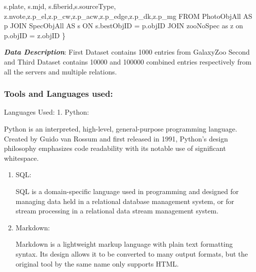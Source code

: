 \documentclass[11pt]{article}
\providecommand{\tightlist}{%
      \setlength{\itemsep}{0pt}\setlength{\parskip}{0pt}}
\newenvironment{Shaded}{}{}
\newcommand{\NormalTok}[1]{{#1}}
\newcommand{\VariableTok}[1]{\textcolor[rgb]{0.10,0.09,0.49}{{#1}}}
\newcommand{\OperatorTok}[1]{\textcolor[rgb]{0.40,0.40,0.40}{{#1}}}
\newcommand{\AttributeTok}[1]{\textcolor[rgb]{0.49,0.56,0.16}{{#1}}}
\begin{document}
\begin{Shaded}
\begin{Highlighting}[]
     \VariableTok{s}\NormalTok{.}\AttributeTok{plate}\OperatorTok{,} \VariableTok{s}\NormalTok{.}\AttributeTok{mjd}\OperatorTok{,} \VariableTok{s}\NormalTok{.}\AttributeTok{fiberid}\OperatorTok{,}\VariableTok{s}\NormalTok{.}\AttributeTok{sourceType}\OperatorTok{,}
     \VariableTok{z}\NormalTok{.}\AttributeTok{nvote}\OperatorTok{,}\VariableTok{z}\NormalTok{.}\AttributeTok{p_el}\OperatorTok{,}\VariableTok{z}\NormalTok{.}\AttributeTok{p_cw}\OperatorTok{,}\VariableTok{z}\NormalTok{.}\AttributeTok{p_acw}\OperatorTok{,}\VariableTok{z}\NormalTok{.}\AttributeTok{p_edge}\OperatorTok{,}\VariableTok{z}\NormalTok{.}\AttributeTok{p_dk}\OperatorTok{,}\VariableTok{z}\NormalTok{.}\AttributeTok{p_mg}
\NormalTok{     FROM PhotoObjAll AS p}
\NormalTok{     JOIN SpecObjAll AS s ON }\VariableTok{s}\NormalTok{.}\AttributeTok{bestObjID} \OperatorTok{=} \VariableTok{p}\NormalTok{.}\AttributeTok{objID} \AttributeTok{JOIN} \AttributeTok{zooNoSpec} \AttributeTok{as} \AttributeTok{z} \AttributeTok{on} \VariableTok{p}\NormalTok{.}\AttributeTok{objID} \OperatorTok{=} \VariableTok{z}\NormalTok{.}\AttributeTok{objID}
\OperatorTok{\}}
\end{Highlighting}
\end{Shaded}

\textbf{\emph{Data Description}}: First Dataset contains 1000 entries
from GalaxyZoo Second and Third Dataset contains 10000 and 100000
combined entries respectively from all the servers and multiple
relations.

    \subsubsection{Tools and Languages
used:}\label{tools-and-languages-used}

Languages Used: 1. Python:

Python is an interpreted, high-level, general-purpose programming
language. Created by Guido van Rossum and first released in 1991,
Python's design philosophy emphasizes code readability with its notable
use of significant whitespace.

\begin{enumerate}
\def\labelenumi{\arabic{enumi}.}
\setcounter{enumi}{1}
\tightlist
\item
  SQL:

  SQL is a domain-specific language used in programming and designed for
  managing data held in a relational database management system, or for
  stream processing in a relational data stream management system.
\item
  Markdown:

  Markdown is a lightweight markup language with plain text formatting
  syntax. Its design allows it to be converted to many output formats,
  but the original tool by the same name only supports HTML.
\end{enumerate}
\end{document}
